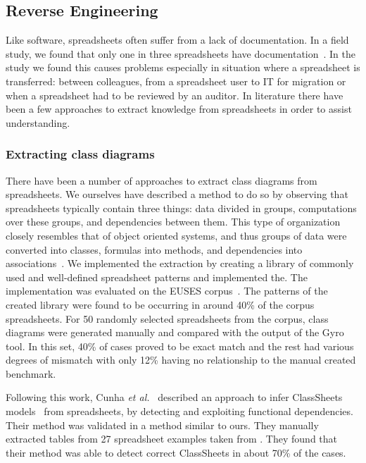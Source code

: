 \documentclass[conference]{IEEEtran}
\begin{document}
\subsection{Reverse Engineering} 
Like software, spreadsheets often suffer from a lack of documentation. In a field study, we found that only one in three spreadsheets have documentation~\cite{hermans_supporting_2011}. In the study we found this causes problems especially in situation where a spreadsheet is transferred: between colleagues, from a spreadsheet user to IT for migration or when a spreadsheet had to be reviewed by an auditor. In literature there have been a few approaches to extract knowledge from spreadsheets in order to assist understanding. 

\subsubsection{Extracting class diagrams}
There have been a number of approaches to extract class diagrams from spreadsheets. We ourselves have described a method to do so by observing that spreadsheets typically contain three things: data divided in groups, computations over these groups, and dependencies between them. This type of organization closely resembles that of object oriented systems, and thus groups of data were converted into classes, formulas into methods, and dependencies into associations~\cite{hermans_automatically_2010}. We implemented the extraction by creating a library of commonly used and well-defined spreadsheet patterns and implemented the. The implementation was evaluated on the EUSES corpus~\cite{fisher_euses_2005}. The patterns of the created library were found to be occurring in around 40\% of the corpus spreadsheets. For 50 randomly selected spreadsheets from the corpus, class diagrams were generated manually and compared with the output of the Gyro tool. In this set, 40\% of cases proved to be exact match and the rest had various degrees of mismatch with only 12\% having no relationship to the manual created benchmark.

Following this work, Cunha \emph{et al.}~\cite{cunha_automatically_2010} described an approach to infer ClassSheets models~\cite{engels_classsheets:_2005} from spreadsheets, by detecting and exploiting functional dependencies. Their method was validated in a method similar to ours. They manually extracted tables from 27 spreadsheet examples taken from \cite{management_2003}. They found that their method was able to detect correct ClassSheets in about 70\% of the cases.
\end{document}
